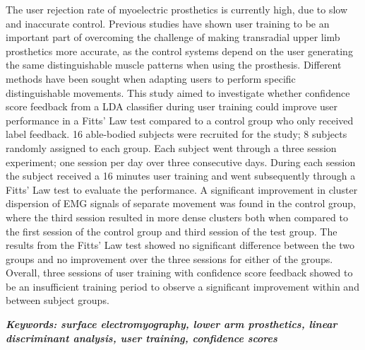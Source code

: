 

The user rejection rate of myoelectric prosthetics is currently high, due to slow and inaccurate control. Previous studies have shown user training to be an important part of overcoming the challenge of making transradial upper limb prosthetics more accurate, as the control systems depend on the user generating the same distinguishable muscle patterns when using the prosthesis. Different methods have been sought when adapting users to perform specific distinguishable movements. This study aimed to investigate whether confidence score feedback from a LDA classifier during user training could improve user performance in a Fitts' Law test compared to a control group who only received label feedback. %
16 able-bodied subjects were recruited for the study; 8 subjects randomly assigned to each group. Each subject went through a three session experiment; one session per day over three consecutive days. During each session the subject received a 16 minutes user training and went subsequently through a Fitts' Law test to evaluate the performance.
A significant improvement in cluster dispersion of EMG signals of separate movement was found in the control group, where the third session resulted in more dense clusters both when compared to the first session of the control group and third session of the test group. The results from the Fitts' Law test showed no significant difference between the two groups and no improvement over the three sessions for either of the groups. Overall, three sessions of user training with confidence score feedback showed to be an insufficient training period to observe a significant improvement within and between subject groups.

\textit{\textbf{Keywords: surface electromyography, lower arm prosthetics, linear discriminant analysis, user training, confidence scores}}